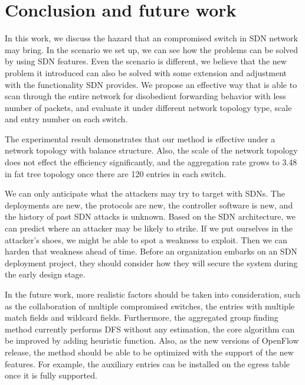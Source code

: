 \chapter{Conclusion and future work}
\label{conclusion}
In this work, we discuss the hazard that an compromised switch in SDN network may bring. In the scenario we set up, we can see how the problems can be solved by using SDN features. Even the scenario is different, we believe that the new problem it introduced can also be solved with some extension and adjustment with the functionality SDN provides. We propose an effective way that is able to scan through the entire network for disobedient forwarding behavior with less number of packets, and evaluate it under different network topology type, scale and entry number on each switch.

The experimental result demonstrates that our method is effective under a network topology with balance structure. Also, the scale of the network topology does not effect the efficiency significantly, and the aggregation rate grows to 3.48 in fat tree topology once there are 120 entries in each switch. 

We can only anticipate what the attackers may try to target with SDNs. The deployments are new, the protocols are new, the controller software is new, and the history of past SDN attacks is unknown. Based on the SDN architecture, we can predict where an attacker may be likely to strike.  If we put ourselves in the attacker’s shoes, we might be able to spot a weakness to exploit. Then we can harden that weakness ahead of time. Before an organization embarks on an SDN deployment project, they should consider how they will secure the system during the early design stage. 

In the future work, more realistic factors should be taken into consideration, such as the collaboration of multiple compromised switches, the entries with multiple match fields and wildcard fields. Furthermore, the aggregated group finding method currently performs DFS without any estimation, the core algorithm can be improved by adding heuristic function. Also, as the new versions of OpenFlow release, the method should be able to be optimized with the support of the new features. For example, the auxiliary entries can be installed on the egress table once it is fully supported.
